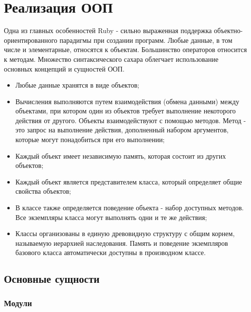 \chapter{Реализация ООП}

Одна из главных особенностей Ruby - сильно выраженная поддержка объектно-ориентированного парадигмы при создании программ. Любые данные, в том числе и элементарные, относятся к объектам. Большинство операторов относится к методам. Множество синтаксического сахара облегчает использование основных концепций и сущностей ООП.
\begin{itemize}
  \item Любые данные хранятся в виде объектов;

  \item Вычисления выполняются путем взаимодействия (обмена данными) между объектами, при котором один из объектов требует выполнение некоторого действия от другого. Объекты взаимодействуют с помощью методов. Метод - это запрос на выполнение действия, дополненный набором аргументов, которые могут понадобиться при его выполнении;

  \item Каждый объект имеет независимую память, которая состоит из других объектов;

  \item Каждый объект является представителем класса, который определяет общие свойства объектов; 

  \item В классе также определяется поведение объекта - набор доступных методов. Все экземпляры класса могут выполнять одни и те же действия;

  \item Классы организованы в единую древовидную структуру с общим корнем, называемую иерархией наследования. Память и поведение экземпляров базового класса автоматически доступны в производном классе.
\end{itemize}

\section{Основные сущности}

\subsection{Модули}

